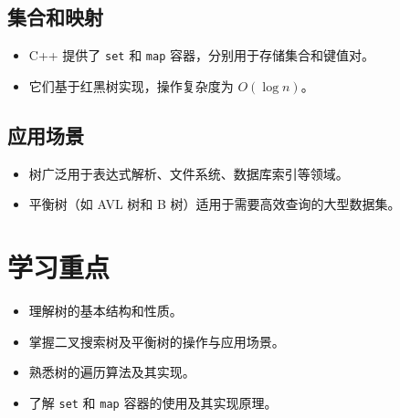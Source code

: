 \documentclass[a4paper,12pt]{article}
\begin{document}
\subsection*{集合和映射}
\begin{itemize}
    \item C++ 提供了 \texttt{set} 和 \texttt{map} 容器，分别用于存储集合和键值对。
    \item 它们基于红黑树实现，操作复杂度为 $O(\log n)$。
\end{itemize}

\subsection*{应用场景}
\begin{itemize}
    \item 树广泛用于表达式解析、文件系统、数据库索引等领域。
    \item 平衡树（如 AVL 树和 B 树）适用于需要高效查询的大型数据集。
\end{itemize}

\section*{学习重点}
\begin{itemize}
    \item 理解树的基本结构和性质。
    \item 掌握二叉搜索树及平衡树的操作与应用场景。
    \item 熟悉树的遍历算法及其实现。
    \item 了解 \texttt{set} 和 \texttt{map} 容器的使用及其实现原理。
\end{itemize}
\end{document}
